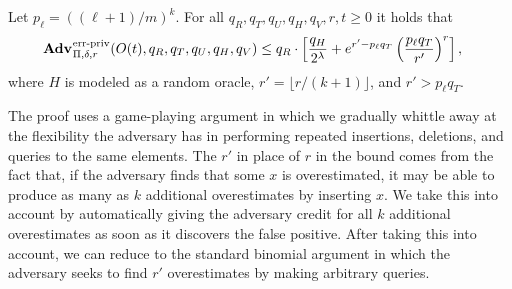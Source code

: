 \begin{theorem}\label{thm:scms-erreps-th}
Let $p_\ell = ((\ell+1)/m)^k$. For all $q_R, q_T, q_U, q_H, q_V, r, t \geq 0$
it holds that
  \begin{equation*}
  \begin{aligned}
    \Adv{\erreps}_{\Pi,\delta,r}(O(t),\,&q_R,q_T,q_U,q_H,q_V) \leq q_R \cdot \left[\frac{q_H}{2^\lambda} + e^{r'-p_\ell q_T}\left(\frac{p_\ell q_T}{r'}\right)^r\right],
  \end{aligned}
\end{equation*}
where $H$ is modeled as a random oracle, $r' = \lfloor r/(k+1) \rfloor$, and $r'
> p_\ell q_T$.
\end{theorem}

The proof uses a game-playing argument in which we gradually whittle away at the flexibility
the adversary has in performing repeated insertions, deletions, and queries to
the same elements. The $r'$ in place of $r$ in the bound comes from the fact
that, if the adversary finds that some $x$ is overestimated, it may be able to
produce as many as $k$ additional overestimates by inserting $x$. We take this
into account by automatically giving the adversary credit for all $k$ additional
overestimates as soon as it discovers the false positive. After taking this into
account, we can reduce to the standard binomial argument in which the adversary
seeks to find $r'$ overestimates by making arbitrary queries.





